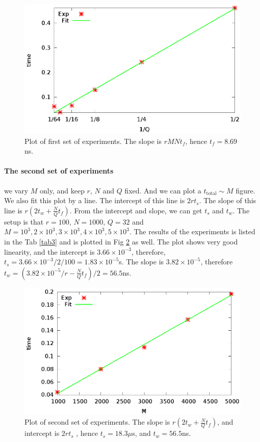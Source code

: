 \begin{figure}[!htb]
	\centering
	\includegraphics[scale=1.]{t3_exp1.eps}
	\caption{Plot of first set of experiments. The slope is $r M N t_f$, hence $t_f = 8.69$ns.}
	\label{fig1}
\end{figure}

\paragraph{The second set of experiments} we vary $M$ only, and keep $r$, $N$ and $Q$ fixed.  And we can plot a $t_{\textrm{total}} \sim M$ figure.
We also fit this plot by a line. The intercept of this line is $2 r t_s$.  The slope of this line is $r (2 t_w + \frac{N}{Q}t_f)$.
From the intercept and slope, we can get $t_s$ and $t_w$. The setup is that $r=100$, $N=1000$, $Q=32$ and $M=10^3, 2\times10^3, 3\times10^3, 4\times10^3, 5\times10^3$.
The results of the experiments is listed in the Tab \ref{tab3} and is plotted in Fig \ref{fig2} as well. The plot shows very good linearity, and the 
intercept is $3.66\times10^{-3}$, therefore, $t_s = 3.66\times10^{-3}/2/100 = 1.83\times10^{-5}$s. The slope is $3.82\times10^{-5}$, therefore $t_w = (3.82\times10^{-5}/r - \frac{N}{Q}t_f)/2 = 56.5$ns.

\begin{figure}[!htb]
	\centering
	\includegraphics[scale=1.]{t3_exp2.eps}
	\caption{Plot of second set of experiments. The slope is $r (2 t_w + \frac{N}{Q}t_f)$, and intercept is $2 r t_s$ , hence $t_s = 18.3\mu$s, and $t_w=56.5$ns.}
	\label{fig2}
\end{figure}

